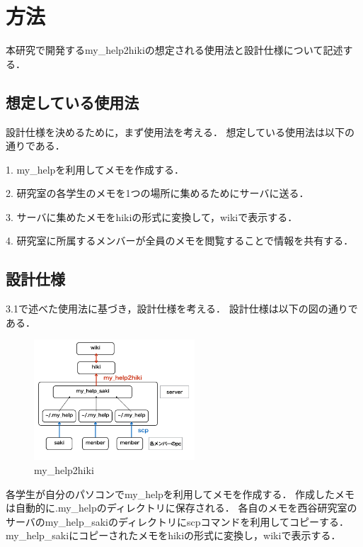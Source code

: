 \section{方法}
本研究で開発するmy\_help2hikiの想定される使用法と設計仕様について記述する．

\subsection{想定している使用法}
設計仕様を決めるために，まず使用法を考える．
想定している使用法は以下の通りである．
\begin{description}
\item 1. my\_helpを利用してメモを作成する．
\item 2. 研究室の各学生のメモを1つの場所に集めるためにサーバに送る．
\item 3. サーバに集めたメモをhikiの形式に変換して，wikiで表示する．
\item 4. 研究室に所属するメンバーが全員のメモを閲覧することで情報を共有する．
\end{description}

\subsection{設計仕様}
3.1で述べた使用法に基づき，設計仕様を考える．
設計仕様は以下の図の通りである．

\begin{figure}[htbp]\begin{center}
\includegraphics[width=6cm,bb=100 100 600 700]{my_help2hiki_saki.010.png}
\caption{my\_help2hiki}
\label{default}\end{center}\end{figure}

各学生が自分のパソコンでmy\_helpを利用してメモを作成する．
作成したメモは自動的に.my\_helpのディレクトリに保存される．
各自のメモを西谷研究室のサーバのmy\_help\_sakiのディレクトリにscpコマンドを利用してコピーする．
my\_help\_sakiにコピーされたメモをhikiの形式に変換し，wikiで表示する．